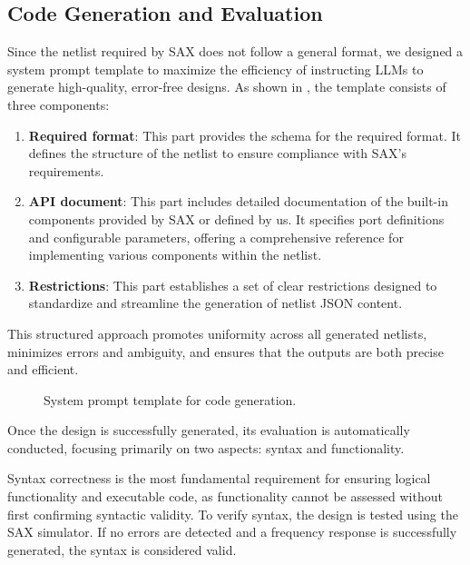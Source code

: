 \subsection{Code Generation and Evaluation}
\label{sec:code_gen_eval}
Since the netlist required by SAX does not follow a general format, we designed a system prompt template to maximize the efficiency of instructing LLMs to generate high-quality, error-free designs. 
As shown in , the template consists of three components: 
\begin{enumerate}
    \item {\textbf{Required format}:} This part provides the schema for the required format. It defines the structure of the netlist to ensure compliance with SAX's requirements.
    \item {\textbf{API document}:} This part includes detailed documentation of the built-in components provided by SAX or defined by us. It specifies port definitions and configurable parameters, offering a comprehensive reference for implementing various components within the netlist.
    \item {\textbf{Restrictions}:} This part establishes a set of clear restrictions designed to standardize and streamline the generation of netlist JSON content.
\end{enumerate}

This structured approach promotes uniformity across all generated netlists, minimizes errors and ambiguity, and ensures that the outputs are both precise and efficient.

\begin{figure}[!tb]
    \centering
      \caption{System prompt template for code generation.}
      \label{fig:sys_prompt}
\end{figure}

Once the design is successfully generated, its evaluation is automatically conducted, focusing primarily on two aspects: syntax and functionality.

Syntax correctness is the most fundamental requirement for ensuring logical functionality and executable code, as functionality cannot be assessed without first confirming syntactic validity. 
To verify syntax, the design is tested using the SAX simulator. 
If no errors are detected and a frequency response is successfully generated, the syntax is considered valid.

